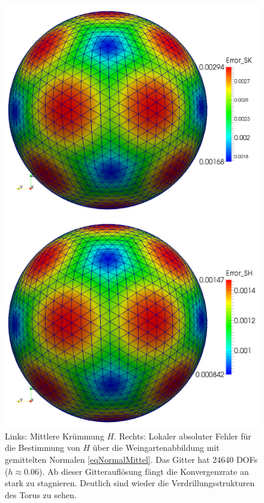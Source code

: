 \begin{figure}
        \caption[Mittlere Krümmung aus Weingartenabb. auf Torus]
                {Links: Mittlere Krümmung \( H \).
                 Rechts: Lokaler absoluter Fehler für die Bestimmung von \( H \) über die Weingartenabbildung mit gemittelten Normalen
                 \eqref{eqNormalMittel}. Das Gitter hat 24640 DOFs (\( h\approx 0.06 \)). 
                 Ab dieser Gitterauflösung fängt die Konvergenzrate an stark zu stagnieren.
                 Deutlich sind wieder die Verdrillungsstrukturen des Torus zu sehen.}
       \label{figMeanTorus}
    \begin{minipage}[t]{0.49\textwidth}
       \centering\includegraphics[width=\textwidth]{bilder/Curvature/sphere/ErrSK2k.png}
    \end{minipage}\hfill
    \begin{minipage}[t]{0.49\textwidth}
       \centering\includegraphics[width=\textwidth]{bilder/Curvature/sphere/ErrSH2k.png}

\end{minipage}
\end{figure}
